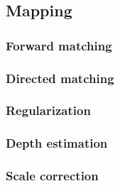 
\subsection{Mapping}

\subsubsection{Forward matching}

\subsubsection{Directed matching}

\subsubsection{Regularization}

\subsubsection{Depth estimation}

\subsubsection{Scale correction}









